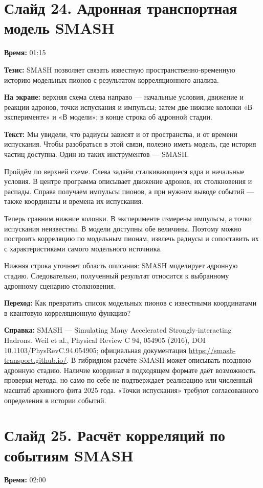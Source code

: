 \documentclass[11pt,a4paper]{article}
\begin{document}
\clearpage
\section*{Слайд 24. Адронная транспортная модель SMASH}
\textbf{Время:} 01:15

\textbf{Тезис:} SMASH позволяет связать известную пространственно-временную историю модельных пионов с результатом корреляционного анализа.

\textbf{На экране:} верхняя схема слева направо — начальные условия, движение и реакции адронов, точки испускания и импульсы; затем две нижние колонки «В эксперименте» и «В модели»; в конце строка об адронной стадии.

\textbf{Текст:} Мы увидели, что радиусы зависят и от пространства, и от времени испускания. Чтобы разобраться в этой связи, полезно иметь модель, где история частиц доступна. Один из таких инструментов — SMASH.

Пройдём по верхней схеме. Слева задаём сталкивающиеся ядра и начальные условия. В центре программа описывает движение адронов, их столкновения и распады. Справа получаем импульсы пионов, а при нужном выводе событий — также координаты и времена их испускания.

Теперь сравним нижние колонки. В эксперименте измерены импульсы, а точки испускания неизвестны. В модели доступны обе величины. Поэтому можно построить корреляцию по модельным пионам, извлечь радиусы и сопоставить их с характеристиками самого модельного источника.

Нижняя строка уточняет область описания: SMASH моделирует адронную стадию. Следовательно, полученный результат относится к выбранному адронному сценарию столкновения.

\textbf{Переход:} Как превратить список модельных пионов с известными координатами в квантовую корреляционную функцию?

\textbf{Справка:} SMASH — Simulating Many Accelerated Strongly-interacting Hadrons. Weil et al., Physical Review C 94, 054905 (2016), DOI 10.1103/PhysRevC.94.054905; официальная документация \url{https://smash-transport.github.io/}. В гибридном расчёте SMASH может описывать позднюю адронную стадию. Наличие координат в подходящем формате даёт возможность проверки метода, но само по себе не подтверждает реализацию или численный масштаб архивного фита 2025 года. «Точки испускания» требуют согласованного определения в истории событий.

\clearpage
\section*{Слайд 25. Расчёт корреляций по событиям SMASH}
\textbf{Время:} 02:00
\end{document}
